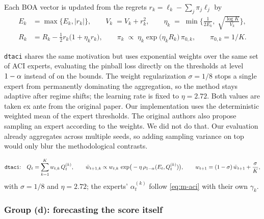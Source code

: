 Each BOA vector is updated from the regrets
$r_k = \ell_k - \sum_j \pi_j \ell_j$ by
\begin{equation}
  \begin{aligned}
    E_k &= \max\{E_k, |r_k|\}, \qquad
    V_k \;= V_k + r_k^2, \qquad
    \eta_k \;=\; \min\!\Big\{\tfrac{1}{2E_k},\; \sqrt{\tfrac{\log K}{V_k}}\Big\},\\
    R_k &= R_k - \tfrac{1}{2} r_k \big(1 + \eta_k r_k\big),
    \qquad
    \pi_k \;\propto\; \eta_k \exp\!\big(\eta_k R_k\big)\, \pi_{0,k},
    \qquad \pi_{0,k} = 1/K .
  \end{aligned}
  \label{eq:m-boa}
\end{equation}

\texttt{dtaci} \parencite{gibbs2024dtaci} shares the same motivation but uses
exponential weights over the same set of ACI experts, evaluating the pinball
loss directly on the thresholds at level $1-\alpha$ instead of on the
bounds. The weight regularization $\sigma = 1/8$ stops a single expert from
permanently dominating the aggregation, so the method stays adaptive after
regime shifts; the learning rate is fixed to $\eta = 2.72$. Both values are
taken ex ante from the original paper. Our implementation uses the
deterministic weighted mean of the expert thresholds. The original authors
also propose sampling an expert according to the weights. We did not do that. Our
evaluation already aggregates across multiple seeds, so adding sampling
variance on top would only blur the methodological contrasts.

\begin{equation}
  \text{\texttt{dtaci}:}\quad
  Q_t = \sum_{k=1}^{K} w_{t,k}\, Q_t^{(k)},
  \qquad
  \bar w_{t+1,k} \propto w_{t,k}\,
    \exp\!\big(-\eta\, \rho_{1-\alpha}(E_t, Q_t^{(k)})\big),
  \qquad
  w_{t+1} = (1-\sigma)\,\bar w_{t+1} + \frac{\sigma}{K},
  \label{eq:m-dtaci}
\end{equation}
with $\sigma = 1/8$ and $\eta = 2.72$; the experts' $\alpha_t^{(k)}$ follow
\cref{eq:m-aci} with their own $\gamma_k$.

\subsubsection{Group (d): forecasting the score itself}
\label{sec:conformal:spci}

